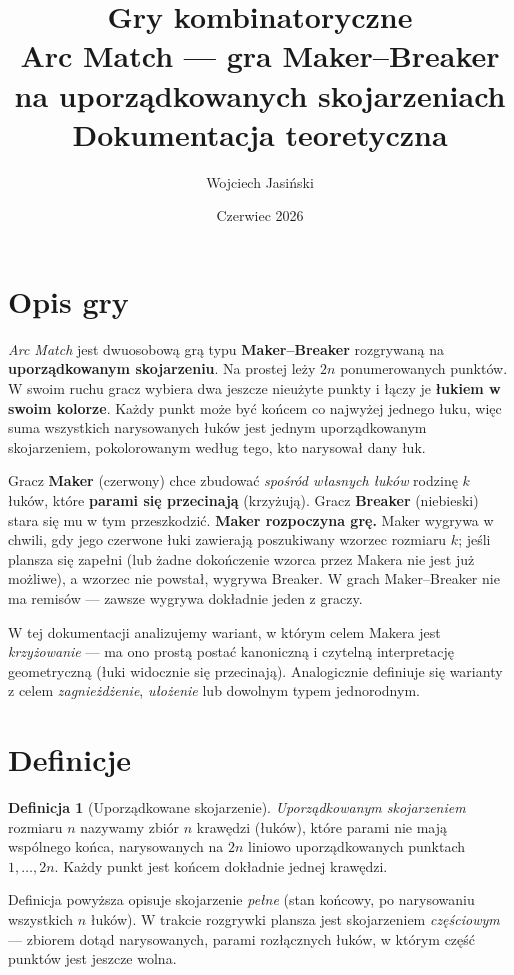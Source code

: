 \documentclass[11pt]{article}
\title{\large Gry kombinatoryczne\\[2pt]
\Large Arc Match --- gra Maker--Breaker na uporządkowanych skojarzeniach\\[4pt]
\large Dokumentacja teoretyczna}
\author{Wojciech Jasiński}
\date{Czerwiec 2026}
\theoremstyle{definition}
\newtheorem{definicja}{Definicja}[section]
\theoremstyle{plain}
\theoremstyle{remark}
\begin{document}
\maketitle

\section{Opis gry}

\emph{Arc Match} jest dwuosobową grą typu \textbf{Maker--Breaker} rozgrywaną na
\textbf{uporządkowanym skojarzeniu}. Na prostej leży $2n$ ponumerowanych punktów. W swoim ruchu gracz
wybiera dwa jeszcze nieużyte punkty i łączy je \textbf{łukiem w swoim kolorze}. Każdy punkt może być
końcem co najwyżej jednego łuku, więc suma wszystkich narysowanych łuków jest jednym uporządkowanym
skojarzeniem, pokolorowanym według tego, kto narysował dany łuk.

Gracz \textbf{Maker} (czerwony) chce zbudować \emph{spośród własnych łuków} rodzinę $k$ łuków, które
\textbf{parami się przecinają} (krzyżują). Gracz \textbf{Breaker} (niebieski) stara się mu w tym
przeszkodzić. \textbf{Maker rozpoczyna grę.} Maker wygrywa w chwili, gdy jego czerwone łuki zawierają
poszukiwany wzorzec rozmiaru $k$; jeśli plansza się zapełni (lub żadne dokończenie wzorca przez Makera
nie jest już możliwe), a wzorzec nie powstał, wygrywa Breaker. W grach Maker--Breaker nie ma remisów
--- zawsze wygrywa dokładnie jeden z graczy.

W tej dokumentacji analizujemy wariant, w którym celem Makera jest \emph{krzyżowanie} --- ma ono
prostą postać kanoniczną i czytelną interpretację geometryczną (łuki widocznie się przecinają).
Analogicznie definiuje się warianty z celem \emph{zagnieżdżenie}, \emph{ułożenie} lub dowolnym typem
jednorodnym.

\section{Definicje}

\begin{definicja}[Uporządkowane skojarzenie]
\emph{Uporządkowanym skojarzeniem} rozmiaru $n$ nazywamy zbiór $n$ krawędzi (łuków), które parami nie
mają wspólnego końca, narysowanych na $2n$ liniowo uporządkowanych punktach $1,\dots,2n$. Każdy punkt
jest końcem dokładnie jednej krawędzi.
\end{definicja}

Definicja powyższa opisuje skojarzenie \emph{pełne} (stan końcowy, po narysowaniu wszystkich $n$
łuków). W trakcie rozgrywki plansza jest skojarzeniem \emph{częściowym} --- zbiorem dotąd narysowanych,
parami rozłącznych łuków, w którym część punktów jest jeszcze wolna.
\end{document}
